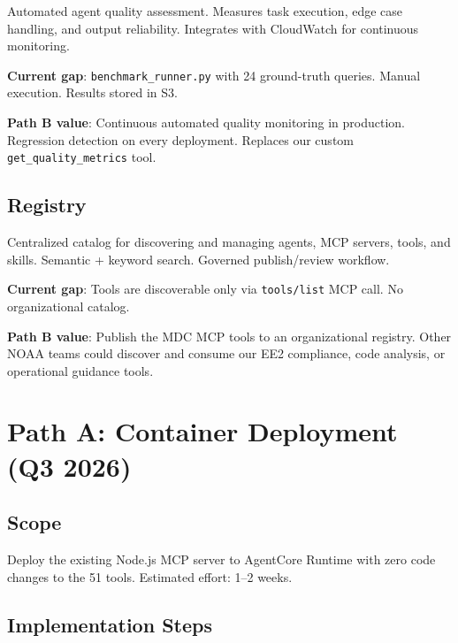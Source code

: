\documentclass[11pt,letterpaper]{article}
\begin{document}
Automated agent quality assessment. Measures task execution, edge case
handling, and output reliability. Integrates with CloudWatch for
continuous monitoring.

\textbf{Current gap}: \texttt{benchmark\_runner.py} with 24 ground-truth
queries. Manual execution. Results stored in S3.

\textbf{Path B value}: Continuous automated quality monitoring in
production. Regression detection on every deployment. Replaces our
custom \texttt{get\_quality\_metrics} tool.

\subsection{Registry}

Centralized catalog for discovering and managing agents, MCP servers,
tools, and skills. Semantic + keyword search. Governed publish/review
workflow.

\textbf{Current gap}: Tools are discoverable only via \texttt{tools/list}
MCP call. No organizational catalog.

\textbf{Path B value}: Publish the MDC MCP tools to an organizational
registry. Other NOAA teams could discover and consume our EE2 compliance,
code analysis, or operational guidance tools.

\section{Path A: Container Deployment (Q3 2026)}

\subsection{Scope}

Deploy the existing Node.js MCP server to AgentCore Runtime with zero
code changes to the 51 tools. Estimated effort: 1--2 weeks.

\subsection{Implementation Steps}
\end{document}
